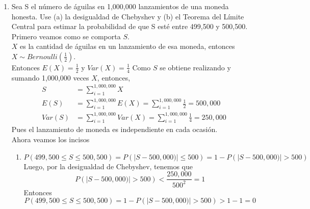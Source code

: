 \documentclass[11pt,a4paper]{report}
\begin{document}
\begin{enumerate}
		\item{
		Sea S el número de águilas en 1,000,000 lanzamientos de una moneda
        honesta. Use (a) la desigualdad de Chebyshev y (b) el Teorema del
        Límite Central para estimar la probabilidad de que S esté entre 499,500
        y 500,500.\\
        Primero veamos como se comporta $S$.\\
        $X$ es la cantidad de águilas en un lanzamiento de esa moneda, entonces
        $X \sim Bernoulli(\frac{1}{2})$.\\
        Entonces $E(X) = \frac{1}{2}$ y $Var(X) = \frac{1}{4}$
        Como $S$ se obtiene realizando y sumando 1,000,000 veces $X$, entonces,
        \begin{align*}
            S &= \sum_{i=1}^{1,000,000}{X}\\
            E(S) &= \sum_{i=1}^{1,000,000}{E(X)}
            = \sum_{i=1}^{1,000,000}{\frac{1}{2}}
            =500,000\\
            Var(S)&= \sum_{i=1}^{1,000,000}{Var(X)}
            = \sum_{i=1}^{1,000,000}{\frac{1}{4}}
            = 250,000
        \end{align*}
        Pues el lanzamiento de moneda es independiente en cada ocasión.\\
        Ahora veamos los incisos
        \begin{enumerate}
            \item {
            \[P(499,500\leq S\leq
             500,500)=P(|S-500,000)|\leq500)=1-P(|S-500,000)|>500)\]
            Luego, por la desigualdad de Chebyshev, tenemos que
            \[P(|S-500,000)|> 500)<\frac{250,000}{500^2} = 1\]
            Entonces
            \[P(499,500\leq S\leq 500,500)=1-P(|S-500,000)|>500)>1 - 1 = 0\]
            }


\end{enumerate}}
\end{enumerate}
\end{document}
